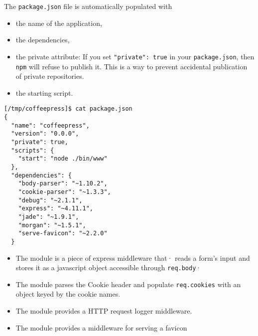 The \verb|package.json| file is automatically populated with 
\begin{itemize}
\item the name of the application, 
\item the dependencies, 
\item the private attribute: If you set \verb|"private": true| in your 
\verb|package.json|, then \verb|npm| will refuse to publish it.  
This is a way to prevent accidental publication of private repositories.
\item the starting script. 
\end{itemize}
\begin{verbatim}
[/tmp/coffeepress]$ cat package.json 
{
  "name": "coffeepress",
  "version": "0.0.0",
  "private": true,
  "scripts": {
    "start": "node ./bin/www"
  },
  "dependencies": {
    "body-parser": "~1.10.2",
    "cookie-parser": "~1.3.3",
    "debug": "~2.1.1",
    "express": "~4.11.1",
    "jade": "~1.9.1",
    "morgan": "~1.5.1",
    "serve-favicon": "~2.2.0"
  }
\end{verbatim}
\begin{itemize}
\item
The module
 is a piece of express middleware that·
reads a form's input and stores it as a javascript
object accessible through \verb|req.body|·

\item
The module
parses the Cookie header and populate \verb|req.cookies| 
with an object keyed by the cookie names. 

\item
The 
module provides a HTTP request logger middleware.
\item
The
module provides a middleware for serving a favicon
\end{itemize}

